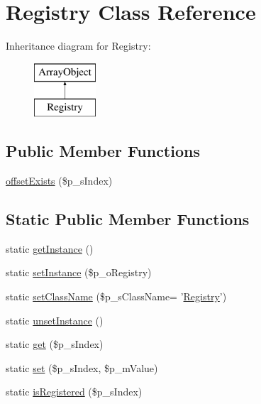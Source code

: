 \hypertarget{class_registry}{\section{Registry Class Reference}
\label{class_registry}
}
Inheritance diagram for Registry\-:\begin{figure}[H]
\begin{center}
\leavevmode
\includegraphics[height=2.000000cm]{class_registry}
\end{center}
\end{figure}
\subsection*{Public Member Functions}
\begin{DoxyCompactItemize}
\item 
\hyperlink{class_registry_a72d07723c008ae1b9e7e3ff006dc40aa}{offset\-Exists} (\$p\-\_\-s\-Index)
\end{DoxyCompactItemize}
\subsection*{Static Public Member Functions}
\begin{DoxyCompactItemize}
\item 
static \hyperlink{class_registry_ac93fbec81f07e5d15f80db907e63dc10}{get\-Instance} ()
\item 
static \hyperlink{class_registry_ae3e77c45ddd8ee222fa2020c25224e28}{set\-Instance} (\$p\-\_\-o\-Registry)
\item 
static \hyperlink{class_registry_a2fa3f8432843f2d4a983039da16d56b2}{set\-Class\-Name} (\$p\-\_\-s\-Class\-Name= '\hyperlink{class_registry}{Registry}')
\item 
static \hyperlink{class_registry_afd3d1c0ff850d37f8fe451be604735f3}{unset\-Instance} ()
\item 
static \hyperlink{class_registry_a624be586dc28014cd2c189beb7060bba}{get} (\$p\-\_\-s\-Index)
\item 
static \hyperlink{class_registry_adfd9ba1232394d791088a0310cd394f6}{set} (\$p\-\_\-s\-Index, \$p\-\_\-m\-Value)
\item 
static \hyperlink{class_registry_a2e51a1575dbd47b8e76da8cb7df36d3d}{is\-Registered} (\$p\-\_\-s\-Index)
\end{DoxyCompactItemize}
